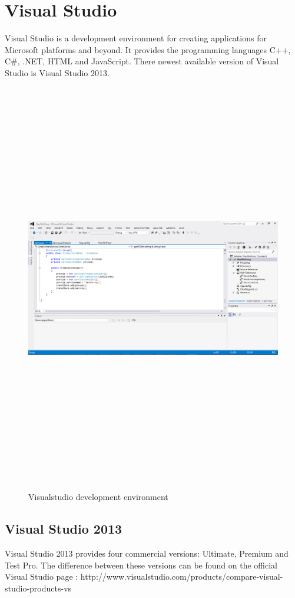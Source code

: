 \section{Visual Studio}
Visual Studio is a development environment for creating applications for Microsoft platforms and beyond. It provides the programming languages C++, C\#, .NET, HTML and JavaScript.
There newest available version of Visual Studio is Visual Studio 2013.\cite{vstudio1}

\begin{figure}[htbp]
\centering
\includegraphics[width=180mm,height=180mm,keepaspectratio]{graphics/visualstudio.png}
\caption{Visualstudio development environment\cite{ajax}}
\end{figure}


\subsection{Visual Studio 2013}
Visual Studio 2013 provides four commercial versions: Ultimate, Premium and Test Pro. The difference between these versions can be found on the official Visual Studio page : http://www.visualstudio.com/products/compare-visual-studio-products-vs
\newpage
